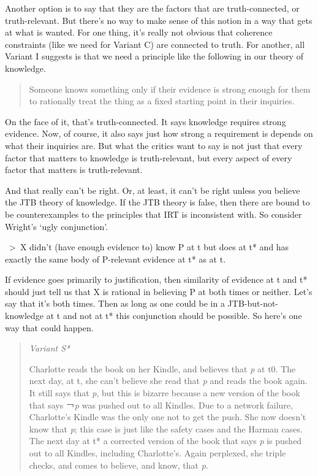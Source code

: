 \documentclass[
  11pt,
]{book}
\begin{document}
Another option is to say that they are the factors that are truth-connected, or truth-relevant. But there's no way to make sense of this notion in a way that gets at what is wanted. For one thing, it's really not obvious that coherence constraints (like we need for Variant C) are connected to truth. For another, all Variant I suggests is that we need a principle like the following in our theory of knowledge.

\begin{quote}
Someone knows something only if their evidence is strong enough for them to rationally treat the thing as a fixed starting point in their inquiries.
\end{quote}

On the face of it, that's truth-connected. It says knowledge requires strong evidence. Now, of course, it also says just how strong a requirement is depends on what their inquiries are. But what the critics want to say is not just that every factor that matters to knowledge is truth-relevant, but every aspect of every factor that matters is truth-relevant.

And that really can't be right. Or, at least, it can't be right unless you believe the JTB theory of knowledge. If the JTB theory is false, then there are bound to be counterexamples to the principles that IRT is inconsistent with. So consider Wright's `ugly conjunction'.

~\textgreater~X didn't (have enough evidence to) know P at t but does at t* and has exactly the same body of P-relevant evidence at t* as at t. \citep[ 368]{Wright2018}

If evidence goes primarily to justification, then similarity of evidence at t and t* should just tell us that X is rational in believing P at both times or neither. Let's say that it's both times. Then as long as one could be in a JTB-but-not-knowledge at t and not at t* this conjunction should be possible. So here's one way that could happen.

\begin{quote}
\emph{Variant S*}

Charlotte reads the book on her Kindle, and believes that \emph{p} at t0. The next day, at t, she can't believe she read that \emph{p} and reads the book again. It still says that \emph{p}, but this is bizarre because a new version of the book that says ￢\emph{p} was pushed out to all Kindles. Due to a network failure, Charlotte's Kindle was the only one not to get the push. She now doesn't know that \emph{p}; this case is just like the safety cases and the Harman cases. The next day at t* a corrected version of the book that says \emph{p} is pushed out to all Kindles, including Charlotte's. Again perplexed, she triple checks, and comes to believe, and know, that \emph{p}.
\end{quote}
\end{document}
